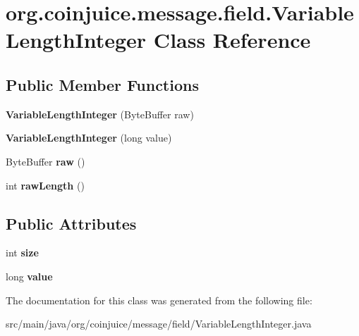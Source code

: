 \hypertarget{classorg_1_1coinjuice_1_1message_1_1field_1_1_variable_length_integer}{\section{org.\-coinjuice.\-message.\-field.\-Variable\-Length\-Integer Class Reference}
\label{classorg_1_1coinjuice_1_1message_1_1field_1_1_variable_length_integer}
}
\subsection*{Public Member Functions}
\begin{DoxyCompactItemize}
\item 
\hypertarget{classorg_1_1coinjuice_1_1message_1_1field_1_1_variable_length_integer_ae1d4892d3d4322503bf9f03baa0da205}{{\bfseries Variable\-Length\-Integer} (Byte\-Buffer raw)}\label{classorg_1_1coinjuice_1_1message_1_1field_1_1_variable_length_integer_ae1d4892d3d4322503bf9f03baa0da205}

\item 
\hypertarget{classorg_1_1coinjuice_1_1message_1_1field_1_1_variable_length_integer_ac26bed7f7ba9bcec6e1b828656a41783}{{\bfseries Variable\-Length\-Integer} (long value)}\label{classorg_1_1coinjuice_1_1message_1_1field_1_1_variable_length_integer_ac26bed7f7ba9bcec6e1b828656a41783}

\item 
\hypertarget{classorg_1_1coinjuice_1_1message_1_1field_1_1_variable_length_integer_a9d1f681cf3c7464d56b4023d0a90c89f}{Byte\-Buffer {\bfseries raw} ()}\label{classorg_1_1coinjuice_1_1message_1_1field_1_1_variable_length_integer_a9d1f681cf3c7464d56b4023d0a90c89f}

\item 
\hypertarget{classorg_1_1coinjuice_1_1message_1_1field_1_1_variable_length_integer_aea1bc0450cc1cae19f84cec5ed807609}{int {\bfseries raw\-Length} ()}\label{classorg_1_1coinjuice_1_1message_1_1field_1_1_variable_length_integer_aea1bc0450cc1cae19f84cec5ed807609}

\end{DoxyCompactItemize}
\subsection*{Public Attributes}
\begin{DoxyCompactItemize}
\item 
\hypertarget{classorg_1_1coinjuice_1_1message_1_1field_1_1_variable_length_integer_a03031246a8e163b0d442d2dc675b2c17}{int {\bfseries size}}\label{classorg_1_1coinjuice_1_1message_1_1field_1_1_variable_length_integer_a03031246a8e163b0d442d2dc675b2c17}

\item 
\hypertarget{classorg_1_1coinjuice_1_1message_1_1field_1_1_variable_length_integer_a2f29bdafbb62f5ade9c8c9cf24dffac2}{long {\bfseries value}}\label{classorg_1_1coinjuice_1_1message_1_1field_1_1_variable_length_integer_a2f29bdafbb62f5ade9c8c9cf24dffac2}

\end{DoxyCompactItemize}


The documentation for this class was generated from the following file\-:\begin{DoxyCompactItemize}
\item 
src/main/java/org/coinjuice/message/field/Variable\-Length\-Integer.\-java\end{DoxyCompactItemize}
